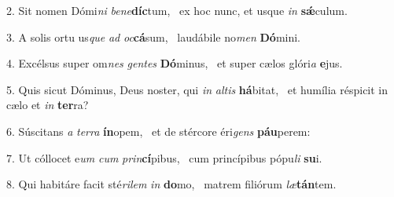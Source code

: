 2. Sit nomen Dómi\textit{ni} \textit{be}\textit{ne}\textbf{díc}tum, \ast\  ex hoc nunc, et usque \textit{in} \textbf{sǽ}culum.\

3. A solis ortu us\textit{que} \textit{ad} \textit{oc}\textbf{cá}sum, \ast\  laudábile no\textit{men} \textbf{Dó}mini.\

4. Excélsus super om\textit{nes} \textit{gen}\textit{tes} \textbf{Dó}minus, \ast\  et super cælos glóri\textit{a} \textbf{e}jus.\

5. Quis sicut Dóminus, Deus noster, qui \textit{in} \textit{al}\textit{tis} \textbf{há}bitat, \ast\  et humília réspicit in cælo et \textit{in} \textbf{ter}ra?\

6. Súscitans \textit{a} \textit{ter}\textit{ra} \textbf{ín}opem, \ast\  et de stércore éri\textit{gens} \textbf{páu}perem:\

7. Ut cóllocet e\textit{um} \textit{cum} \textit{prin}\textbf{cí}pibus, \ast\  cum princípibus pópu\textit{li} \textbf{su}i.\

8. Qui habitáre facit sté\textit{ri}\textit{lem} \textit{in} \textbf{do}mo, \ast\  matrem filiórum \textit{læ}\textbf{tán}tem.\

